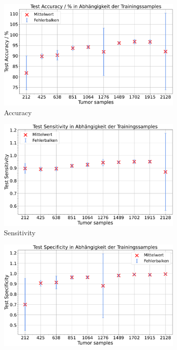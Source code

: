 \begin{figure}[H]
  \centering
  \begin{subfigure}[b]{0.48\textwidth}
    \includegraphics[width=\textwidth]{plots/neu Reduzierung-Tu + Balance_Accuracy_mean.pdf}
    \caption{Accuracy}
    \label{fig:reduzierung_tu_accuracy}
  \end{subfigure}
  \begin{subfigure}[b]{0.48\textwidth}
    \includegraphics[width=\textwidth]{plots/neu Reduzierung-Tu + Balance_Sensitivity_mean.pdf}
    \caption{Sensitivity}
    \label{fig:reduzierung_tu_sensitivity}
  \end{subfigure}
  \begin{subfigure}[b]{0.48\textwidth}
    \includegraphics[width=\textwidth]{plots/neu Reduzierung-Tu + Balance_Specificity_mean.pdf}

\end{subfigure}
\end{figure}
